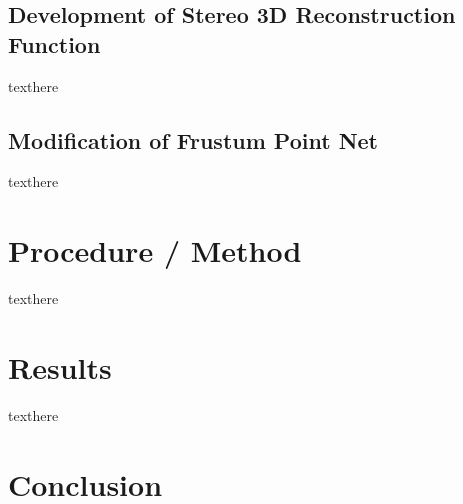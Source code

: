 \subsection{Development of Stereo 3D Reconstruction Function}
texthere

\subsection{Modification of Frustum Point Net}
texthere

\section{Procedure / Method}
texthere

\section{Results}
texthere

\section{Conclusion}

